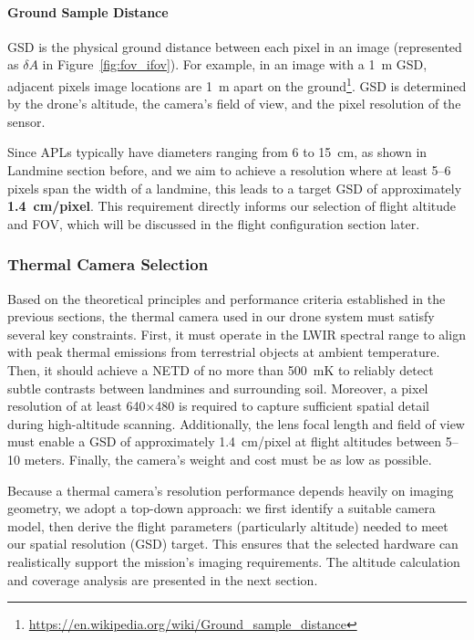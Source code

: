 \paragraph{Ground Sample Distance}

\gls{GSD} is the physical ground distance between each pixel in an image (represented as \( \delta A \) in Figure~\ref{fig:fov_ifov}). For example, in an image with a 1~m \gls{GSD}, adjacent pixels image locations are 1~m apart on the ground\footnote{\url{https://en.wikipedia.org/wiki/Ground_sample_distance}}. \gls{GSD} is determined by the drone’s altitude, the camera’s field of view, and the pixel resolution of the sensor.

Since \gls{APL}s typically have diameters ranging from 6 to 15~cm, as shown in Landmine section before, and we aim to achieve a resolution where at least 5–6 pixels span the width of a landmine, this leads to a target \gls{GSD} of approximately \textbf{1.4~cm/pixel}. This requirement directly informs our selection of flight altitude and \gls{FOV}, which will be discussed in the flight configuration section later.


\subsubsection{Thermal Camera Selection}\label{thermal_selection}

Based on the theoretical principles and performance criteria established in the previous sections, the thermal camera used in our drone system must satisfy several key constraints. First, it must operate in the \gls{LWIR} spectral range to align with peak thermal emissions from terrestrial objects at ambient temperature. Then, it should achieve a \gls{NETD} of no more than 500~mK to reliably detect subtle contrasts between landmines and surrounding soil. Moreover, a pixel resolution of at least 640×480 is required to capture sufficient spatial detail during high-altitude scanning. Additionally, the lens focal length and field of view must enable a \gls{GSD} of approximately 1.4~cm/pixel at flight altitudes between 5–10 meters. Finally, the camera’s weight and cost must be as low as possible.

Because a thermal camera’s resolution performance depends heavily on imaging geometry, we adopt a top-down approach: we first identify a suitable camera model, then derive the flight parameters (particularly altitude) needed to meet our spatial resolution (\gls{GSD}) target. This ensures that the selected hardware can realistically support the mission’s imaging requirements. The altitude calculation and coverage analysis are presented in the next section.

